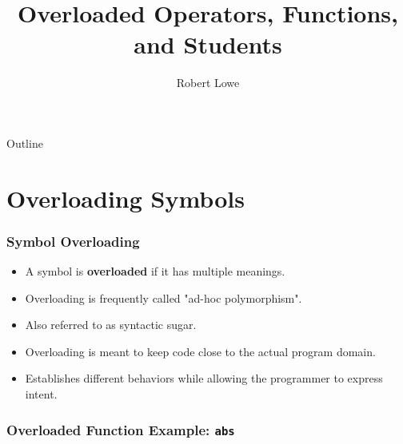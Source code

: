 \documentclass{beamer}
\title{Overloaded Operators, Functions, and Students}
\author{Robert Lowe\\}
\institute[Maryville College] %
{
  Division of Mathematics and Computer Science\\
  Maryville College
}
\date[]{}
\begin{document}
\begin{frame}
  \titlepage
\end{frame}

\begin{frame}{Outline}
  \tableofcontents
\end{frame}




\section{Overloading Symbols}
\begin{frame}
    \frametitle{Symbol Overloading}
    
    \begin{itemize}
        \item<2-> A symbol is {\bf overloaded} if it has multiple meanings.
        \item<3-> Overloading is frequently called "ad-hoc polymorphism".
        \item<4-> Also referred to as syntactic sugar.
        \item<5-> Overloading is meant to keep code close to the actual
          program domain.
        \item<6-> Establishes different behaviors while allowing the 
          programmer to express intent.
    \end{itemize}
\end{frame}


\begin{frame}
    \frametitle{Overloaded Function Example: {\tt abs}}
    \vspace{0.25in} 
    \par{}
\end{frame}
\end{document}
